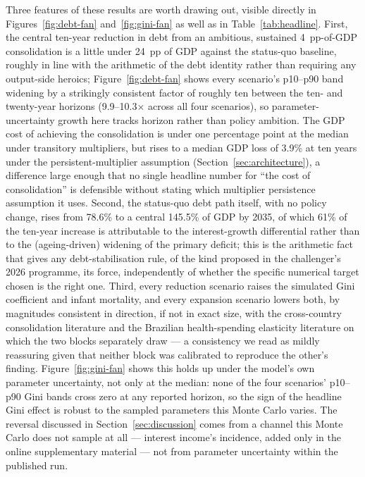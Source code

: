 \documentclass[11pt,a4paper]{article}
\begin{document}
Three features of these results are worth drawing out, visible directly in Figures~\ref{fig:debt-fan} and~\ref{fig:gini-fan} as well as in Table~\ref{tab:headline}. First, the central ten-year reduction in debt from an ambitious, sustained 4~pp-of-GDP consolidation is a little under 24~pp of GDP against the status-quo baseline, roughly in line with the arithmetic of the debt identity rather than requiring any output-side heroics; Figure~\ref{fig:debt-fan} shows every scenario's p10--p90 band widening by a strikingly consistent factor of roughly ten between the ten- and twenty-year horizons (9.9--10.3$\times$ across all four scenarios), so parameter-uncertainty growth here tracks horizon rather than policy ambition. The GDP cost of achieving the consolidation is under one percentage point at the median under transitory multipliers, but rises to a median GDP loss of 3.9\% at ten years under the persistent-multiplier assumption (Section~\ref{sec:architecture}), a difference large enough that no single headline number for ``the cost of consolidation'' is defensible without stating which multiplier persistence assumption it uses. Second, the status-quo debt path itself, with no policy change, rises from 78.6\% to a central 145.5\% of GDP by 2035, of which 61\% of the ten-year increase is attributable to the interest-growth differential rather than to the (ageing-driven) widening of the primary deficit; this is the arithmetic fact that gives any debt-stabilisation rule, of the kind proposed in the challenger's 2026 programme, its force, independently of whether the specific numerical target chosen is the right one. Third, every reduction scenario raises the simulated Gini coefficient and infant mortality, and every expansion scenario lowers both, by magnitudes consistent in direction, if not in exact size, with the cross-country consolidation literature \citep{ballfurcerilleighlloungani2013} and the Brazilian health-spending elasticity literature \citep{szkloclarkerocha2024} on which the two blocks separately draw --- a consistency we read as mildly reassuring given that neither block was calibrated to reproduce the other's finding. Figure~\ref{fig:gini-fan} shows this holds up under the model's own parameter uncertainty, not only at the median: none of the four scenarios' p10--p90 Gini bands cross zero at any reported horizon, so the sign of the headline Gini effect is robust to the sampled parameters this Monte Carlo varies. The reversal discussed in Section~\ref{sec:discussion} comes from a channel this Monte Carlo does not sample at all --- interest income's incidence, added only in the online supplementary material --- not from parameter uncertainty within the published run.
\end{document}
